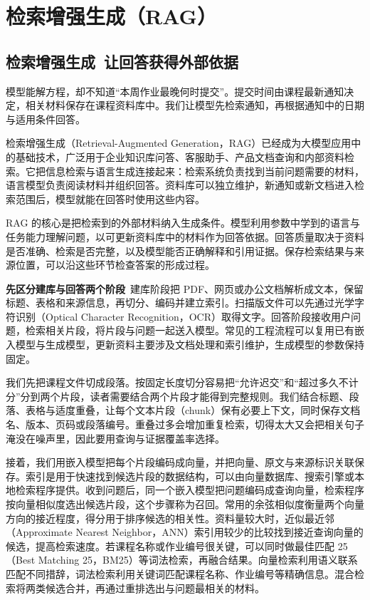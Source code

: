 \chapter{检索增强生成（RAG）}\label{检索增强生成}

\section{检索增强生成~让回答获得外部依据}\label{检索增强生成 RAG 让回答获得外部依据}

模型能解方程，却不知道``本周作业最晚何时提交''。提交时间由课程最新通知决定，相关材料保存在课程资料库中。我们让模型先检索通知，再根据通知中的日期与适用条件回答。

检索增强生成（Retrieval-Augmented Generation，RAG）已经成为大模型应用中的基础技术，广泛用于企业知识库问答、客服助手、产品文档查询和内部资料检索。它把信息检索与语言生成连接起来：检索系统负责找到当前问题需要的材料，语言模型负责阅读材料并组织回答。资料库可以独立维护，新通知或新文档进入检索范围后，模型就能在回答时使用这些内容。

RAG 的核心是把检索到的外部材料纳入生成条件。模型利用参数中学到的语言与任务能力理解问题，以可更新资料库中的材料作为回答依据。回答质量取决于资料是否准确、检索是否完整，以及模型能否正确解释和引用证据。保存检索结果与来源位置，可以沿这些环节检查答案的形成过程。

\textbf{先区分建库与回答两个阶段}~建库阶段把 PDF、网页或办公文档解析成文本，保留标题、表格和来源信息，再切分、编码并建立索引。扫描版文件可以先通过光学字符识别（Optical Character Recognition，OCR）取得文字。回答阶段接收用户问题，检索相关片段，将片段与问题一起送入模型。常见的工程流程可以复用已有嵌入模型与生成模型，更新资料主要涉及文档处理和索引维护，生成模型的参数保持固定。

我们先把课程文件切成段落。按固定长度切分容易把``允许迟交''和``超过多久不计分''分到两个片段，读者需要结合两个片段才能得到完整规则。我们结合标题、段落、表格与适度重叠，让每个文本片段（chunk）保有必要上下文，同时保存文档名、版本、页码或段落编号。重叠过多会增加重复检索，切得太大又会把相关句子淹没在噪声里，因此要用查询与证据覆盖率选择。

接着，我们用嵌入模型把每个片段编码成向量，并把向量、原文与来源标识关联保存。索引是用于快速找到候选片段的数据结构，可以由向量数据库、搜索引擎或本地检索程序提供。收到问题后，同一个嵌入模型把问题编码成查询向量，检索程序按向量相似度选出候选片段，这个步骤称为召回。常用的余弦相似度衡量两个向量方向的接近程度，得分用于排序候选的相关性。资料量较大时，近似最近邻（Approximate Nearest Neighbor，ANN）索引用较少的比较找到接近查询向量的候选，提高检索速度。若课程名称或作业编号很关键，可以同时做最佳匹配 25（Best Matching 25，BM25）等词法检索，再融合结果。向量检索利用语义联系匹配不同措辞，词法检索利用关键词匹配课程名称、作业编号等精确信息。混合检索将两类候选合并，再通过重排选出与问题最相关的材料。

